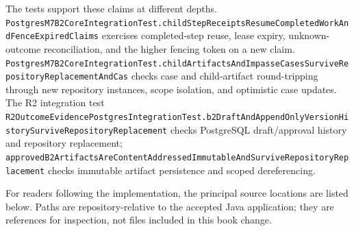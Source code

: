 The tests support these claims at different depths. \texttt{Postgres\allowbreak M7\allowbreak B2\allowbreak Core\allowbreak Integration\allowbreak Test.\allowbreak child\allowbreak Step\allowbreak Receipts\allowbreak Resume\allowbreak Completed\allowbreak Work\allowbreak And\allowbreak Fence\allowbreak Expired\allowbreak Claims} exercises completed-step reuse, lease expiry, unknown-outcome reconciliation, and the higher fencing token on a new claim. \texttt{Postgres\allowbreak M7\allowbreak B2\allowbreak Core\allowbreak Integration\allowbreak Test.\allowbreak child\allowbreak Artifacts\allowbreak And\allowbreak Impasse\allowbreak Cases\allowbreak Survive\allowbreak Repository\allowbreak Replacement\allowbreak And\allowbreak Cas} checks case and child-artifact round-tripping through new repository instances, scope isolation, and optimistic case updates. The R2 integration test \texttt{R2\allowbreak Outcome\allowbreak Evidence\allowbreak Postgres\allowbreak Integration\allowbreak Test.\allowbreak b2\allowbreak Draft\allowbreak And\allowbreak Append\allowbreak Only\allowbreak Version\allowbreak History\allowbreak Survive\allowbreak Repository\allowbreak Replacement} checks PostgreSQL draft/approval history and repository replacement; \texttt{approved\allowbreak B2\allowbreak Artifacts\allowbreak Are\allowbreak Content\allowbreak Addressed\allowbreak Immutable\allowbreak And\allowbreak Survive\allowbreak Repository\allowbreak Replacement} checks immutable artifact persistence and scoped dereferencing.

For readers following the implementation, the principal source locations are listed below. Paths are repository-relative to the accepted Java application; they are references for inspection, not files included in this book change.


